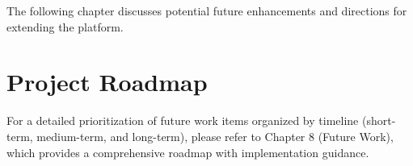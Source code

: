 The following chapter discusses potential future enhancements and directions for extending the platform.

\section*{Project Roadmap}

For a detailed prioritization of future work items organized by timeline (short-term, medium-term, and long-term), please refer to Chapter 8 (Future Work), which provides a comprehensive roadmap with implementation guidance.
